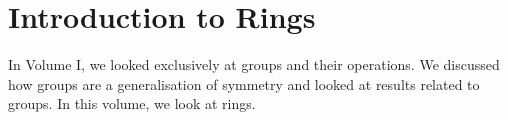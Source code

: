 
\usepackage{xr}

\newcommand{\version}{0.1}
\newcommand{\volumenumber}{2}
\newcommand{\volumename}{Rings}
\newcommand{\volumeimage}{cover/Integers Modulo n.png}

\linespread{1.05}




\newcommand{\ideal}[1]{\mathfrak{#1}}                %
\newcommand{\princ}[1]{\left\langle#1\right\rangle}  %

\newcommand{\C}{\mathbb{C}}                        %
\newcommand{\Mn}[2]{\mathcal{M}_{#1\times#1}(#2)}  %
\newcommand{\Q}{\mathbb{Q}}                        %
\newcommand{\R}{\mathbb{R}}                        %
\newcommand{\Z}{\mathbb{Z}}                        %
\newcommand{\Zn}[1]{\mathbb{Z}_{#1}}               %

\newcommand{\Ann}[2]{\mathrm{Ann}_{#1}(#2)}  %
\newcommand{\Char}[1]{\mathrm{char}(#1)}     %
\newcommand{\Nilr}[1]{\mathfrak{N}_{#1}}     %

\newcommand{\quotepagetext}{
    [Some] of the major discoveries in ring theory have helped shape the course of development of modern abstract algebra... A course in ring theory is an indispensable part of the education of any fledgling algebraist.
}
\newcommand{\quotepageattribution}{Tsit-Yuen Lam, 2001}
\newcommand{\quotepagecitation}{\cite{lam_2001}}

\newcommand{\prefacevolumetext}{
    This volume covers the basics of ring theory. %
}
\newcommand{\prefacevolumedate}{}  %

\newcommand{\interdependencenotes}{
}


\frontmatterpages

\chapter{Introduction to Rings}
In Volume I, we looked exclusively at groups and their operations. We discussed how groups are a generalisation of symmetry and looked at results related to groups. In this volume, we look at rings.


